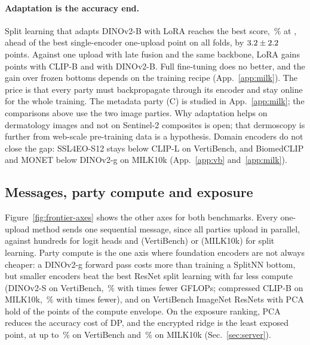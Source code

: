 \paragraph{Adaptation is the accuracy end.}
Split learning that adapts DINOv2-B with LoRA reaches the best score, \frMilkBest\,\% at \frMilkBestBytes{}, ahead of the best single-encoder one-upload point on all \fzLoraOverBestWins{} folds, by $3.2\pm2.2$ points. Against one upload with late fusion and the same backbone, LoRA gains \fzGapViewsCb{} points with CLIP-B and \fzGapViewsB{} with DINOv2-B. Full fine-tuning does no better, and the gain over frozen bottoms depends on the training recipe (App.~\ref{app:milk}). The price is that every party must backpropagate through its encoder and stay online for the whole training. The metadata party (C) is studied in App.~\ref{app:milk}; the comparisons above use the two image parties. Why adaptation helps on dermatology images and not on Sentinel-2 composites is open; that dermoscopy is further from web-scale pre-training data is a hypothesis. Domain encoders do not close the gap: SSL4EO-S12 stays below CLIP-L on VertiBench, and BiomedCLIP and MONET below DINOv2-g on MILK10k (App.~\ref{app:vb} and~\ref{app:milk}).

\subsection{Messages, party compute and exposure}\label{sec:frontier-other}
Figure~\ref{fig:frontier-axes} shows the other axes for both benchmarks. Every one-upload method sends one sequential message, since all parties upload in parallel, against hundreds for logit heads and \frVbRoundsSplitNN{} (VertiBench) or \frMilkRoundsSplitNN{} (MILK10k) for split learning. Party compute is the one axis where foundation encoders are not always cheaper: a DINOv2-g forward pass costs more than training a SplitNN bottom, but smaller encoders beat the best ResNet split learning with far less compute (DINOv2-S on VertiBench, \frVbGflopsMatchAcc\,\% with \frVbGflopsRatio{} times fewer GFLOPs; compressed CLIP-B on MILK10k, \frMilkGflopsMatchAcc\,\% with \frMilkGflopsRatio{} times fewer), and on VertiBench ImageNet ResNets with PCA hold \frVbNParetoGflopsNonFound{} of the \frVbNParetoGflops{} points of the compute envelope. On the exposure ranking, PCA reduces the accuracy cost of DP, and the encrypted ridge is the least exposed point, at up to \frVbHeBest\,\% on VertiBench and \frMilkHeBest\,\% on MILK10k (Sec.~\ref{sec:server}).
